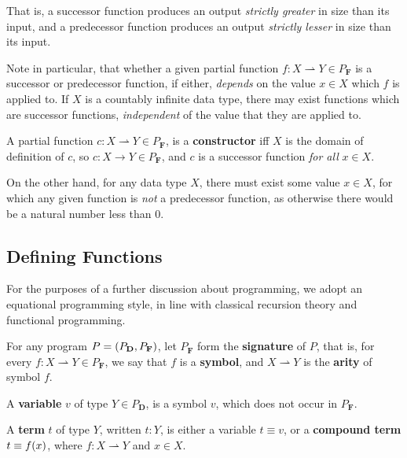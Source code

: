 That is, a successor function produces an output \emph{strictly greater} in
size than its input, and a predecessor function produces an output
\emph{strictly lesser} in size than its input.

Note in particular, that whether a given partial function $f : X
\rightharpoonup Y \in P_\mathbf{F}$ is a successor or predecessor function, if
either, \emph{depends} on the value $x \in X$ which $f$ is applied to. If $X$
is a countably infinite data type, there may exist functions which are
successor functions, \emph{independent} of the value that they are applied to.

\begin{definition} A partial function $c : X \rightharpoonup Y \in
P_\mathbf{F}$, is a \textbf{constructor} iff $X$ is the domain of definition of
$c$, so $c : X \rightarrow Y \in P_\mathbf{F}$, and $c$ is a successor function
\emph{for all} $x \in X$. \end{definition}

On the other hand, for any data type $X$, there must exist some value $x \in
X$, for which any given function is \emph{not} a predecessor function, as
otherwise there would be a natural number less than $0$.

\subsection{Defining Functions}

For the purposes of a further discussion about programming, we adopt an
equational programming style, in line with classical recursion theory and
functional programming.

\begin{definition} For any program $P = {\mathopen{}\left({P_\mathbf{D}, P_\mathbf{F}}\right)\mathclose{}}$, let
$P_\mathbf{F}$ form the \textbf{signature} of $P$, that is, for every $f : X
\rightharpoonup Y \in P_\mathbf{F}$, we say that $f$ is a \textbf{symbol}, and
$X \rightharpoonup Y$ is the \textbf{arity} of symbol $f$. \end{definition}

\begin{definition} A \textbf{variable} $v$ of type $Y \in P_\mathbf{D}$, is a
symbol $v$, which does not occur in $P_\mathbf{F}$. \end{definition}

\begin{definition} A \textbf{term} $t$ of type $Y$, written $t : Y$, is either
a variable $t \equiv v$, or a \textbf{compound term} $t \equiv f{\mathopen{}\left({x}\right)\mathclose{}}$, where
$f : X \rightharpoonup Y$ and $x \in X$. \end{definition} 

